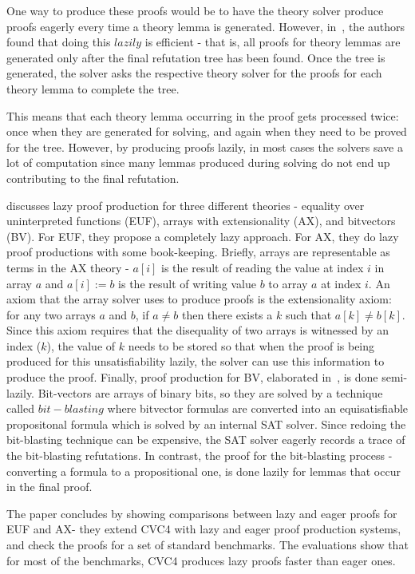 \documentclass{article}
\begin{document}
One way to produce these proofs would be to have the theory solver 
produce proofs eagerly every time a theory lemma is generated. 
However, in~\cite{DBLP:conf/fmcad/KatzBTRH16}, the authors found that
doing this $lazily$ is efficient - that is, 
all proofs for theory lemmas are 
generated only after the final refutation tree has been found. 
Once the tree is generated, the solver asks the respective theory
solver for the proofs for each theory lemma to complete the tree.

This means that each theory lemma occurring in the proof gets 
processed twice: once when they are generated for solving, and 
again when they need to be proved for the tree. However, by 
producing proofs lazily, in most cases the solvers save a lot 
of computation since many lemmas produced during solving do not
end up contributing to the final refutation.

\cite{DBLP:conf/fmcad/KatzBTRH16} discusses lazy proof 
production for three different theories - equality over
uninterpreted functions (EUF), arrays with extensionality 
(AX), and bitvectors (BV). For EUF, they propose a 
completely lazy approach. For AX, they do lazy proof 
productions with some book-keeping. Briefly, arrays are 
representable as terms in the AX theory - $a[i]$ is 
the result of reading the value at index $i$ in array $a$
and $a[i] := b$ is the result of writing value $b$ to 
array $a$ at index $i$. An axiom that the array solver 
uses to produce proofs is the extensionality axiom:
for any two arrays $a$ and $b$, if $a \neq b$ then 
there exists a $k$ such that $a[k] \neq b[k]$.
Since this axiom requires that the disequality of two 
arrays is witnessed by an index ($k$), the value of
$k$ needs to be stored so that when the proof is 
being produced for this unsatisfiability lazily, the 
solver can use this information to produce the proof.
Finally, proof production for BV, elaborated 
in~\cite{DBLP:conf/lpar/HadareanBRTD15}, is done 
semi-lazily. Bit-vectors are arrays of binary bits, 
so they are solved by a technique called $bit-blasting$
where bitvector formulas are converted into an 
equisatisfiable propositonal formula which is solved 
by an internal SAT solver. Since redoing the 
bit-blasting technique can be expensive, the SAT 
solver eagerly records a trace of the bit-blasting 
refutations. In contrast, the proof for the 
bit-blasting process - converting a formula 
to a propositional one, is done lazily for lemmas 
that occur in the final proof. 

The paper concludes by showing comparisons between 
lazy and eager proofs for EUF and AX- 
they extend CVC4 with lazy and eager proof production
systems, and check the proofs for a set of 
standard benchmarks. The evaluations show that for most 
of the benchmarks, CVC4 produces lazy proofs faster 
than eager ones.
\end{document}
